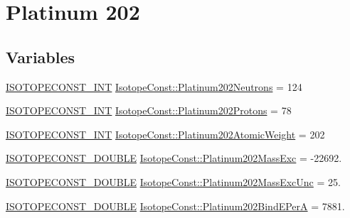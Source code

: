 \hypertarget{group___isotope_const-_platinum-_pt202}{}\section{Platinum 202}
\label{group___isotope_const-_platinum-_pt202}
\subsection*{Variables}
\begin{DoxyCompactItemize}
\item 
\mbox{\hyperlink{group___isotope_const-_macros_ga5f18360b3e99483a35c32d789e62621c}{I\+S\+O\+T\+O\+P\+E\+C\+O\+N\+S\+T\+\_\+\+I\+NT}} \mbox{\hyperlink{group___isotope_const-_platinum-_pt202_ga6b98097b2dfd235695bd232d03bfdb53}{Isotope\+Const\+::\+Platinum202\+Neutrons}} = 124
\item 
\mbox{\hyperlink{group___isotope_const-_macros_ga5f18360b3e99483a35c32d789e62621c}{I\+S\+O\+T\+O\+P\+E\+C\+O\+N\+S\+T\+\_\+\+I\+NT}} \mbox{\hyperlink{group___isotope_const-_platinum-_pt202_gae58034d004f3c0c96984cd44e0684632}{Isotope\+Const\+::\+Platinum202\+Protons}} = 78
\item 
\mbox{\hyperlink{group___isotope_const-_macros_ga5f18360b3e99483a35c32d789e62621c}{I\+S\+O\+T\+O\+P\+E\+C\+O\+N\+S\+T\+\_\+\+I\+NT}} \mbox{\hyperlink{group___isotope_const-_platinum-_pt202_ga37d99060cdc2f2b85ff7f1905c476307}{Isotope\+Const\+::\+Platinum202\+Atomic\+Weight}} = 202
\item 
\mbox{\hyperlink{group___isotope_const-_macros_ga8f45a7272ce02c0b4c65c44636ed719a}{I\+S\+O\+T\+O\+P\+E\+C\+O\+N\+S\+T\+\_\+\+D\+O\+U\+B\+LE}} \mbox{\hyperlink{group___isotope_const-_platinum-_pt202_ga10dc30d2ec3a103d313a6f3f0259221d}{Isotope\+Const\+::\+Platinum202\+Mass\+Exc}} = -\/22692.
\item 
\mbox{\hyperlink{group___isotope_const-_macros_ga8f45a7272ce02c0b4c65c44636ed719a}{I\+S\+O\+T\+O\+P\+E\+C\+O\+N\+S\+T\+\_\+\+D\+O\+U\+B\+LE}} \mbox{\hyperlink{group___isotope_const-_platinum-_pt202_ga6b03eabab7e995a1f0e2472e01d4bc06}{Isotope\+Const\+::\+Platinum202\+Mass\+Exc\+Unc}} = 25.
\item 
\mbox{\hyperlink{group___isotope_const-_macros_ga8f45a7272ce02c0b4c65c44636ed719a}{I\+S\+O\+T\+O\+P\+E\+C\+O\+N\+S\+T\+\_\+\+D\+O\+U\+B\+LE}} \mbox{\hyperlink{group___isotope_const-_platinum-_pt202_ga86a65ef87fbc5bc38d1e76a5edf5e8e6}{Isotope\+Const\+::\+Platinum202\+Bind\+E\+PerA}} = 7881.
\item 

\end{DoxyCompactItemize}
